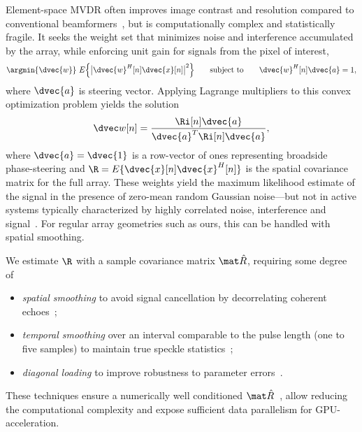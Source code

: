 {Element-space MVDR often improves image contrast and resolution compared to conventional beamformers~\cite{Benitz1997,Synnevag2007,Blomberg2013,Blomberg2012a,Dursun2009,Lo2004}, but is computationally complex and statistically fragile. It seeks the weight set that minimizes noise and interference accumulated by the array, while enforcing unit gain for signals from the pixel of interest,
%
\begin{gather}
\argmin{\dvec{w}}\ E\Big\{\big|\dvec{w}^H[n]\dvec{x}[n]\big|^2\Big\} \qquad\text{subject to}\qquad \dvec{w}^H[n]\dvec{a} = 1, \label{2_eq_mvdr_def}
\end{gather}
%
where $\dvec{a}$ is steering vector. Applying Lagrange multipliers to this convex optimization problem yields the solution
%
\begin{gather}
\dvec w[n] = \frac{\Ri[n]\dvec{a}}{\dvec{a}^T\Ri[n]\dvec{a}}, \label{2_eq_weights}
\end{gather}
%
where $\dvec{a}=\dvec{1}$ is a row-vector of ones representing broadside phase-steering and $\R=E\{\dvec{x}[n]\dvec{x}^H[n]\}$ is the spatial covariance matrix for the full array. These weights yield the maximum likelihood estimate of the signal in the presence of zero-mean random Gaussian noise---but not in active systems typically characterized by highly correlated noise, interference and signal~\cite{Widrow1982}. For regular array geometries such as ours, this can be handled with spatial smoothing. 

We estimate $\R$ with a sample covariance matrix $\eR$, requiring some degree of
%
\begin{itemize}
\item \emph{spatial smoothing} to avoid signal cancellation by decorrelating coherent echoes~\cite{Kailath1985};
\item \emph{temporal smoothing} over an interval comparable to the pulse length (one to five samples) to maintain true speckle statistics~\cite{Synnevag2009a};
\item \emph{diagonal loading} to improve robustness to parameter errors~\cite{Cox1987,Maksym1979,VanTrees2002}.
\end{itemize}%
%
These techniques ensure a numerically well conditioned $\eR$~\cite{VanTrees2002,Kailath1985}, allow reducing the computational complexity and expose sufficient data parallelism for GPU-acceleration. 

}
